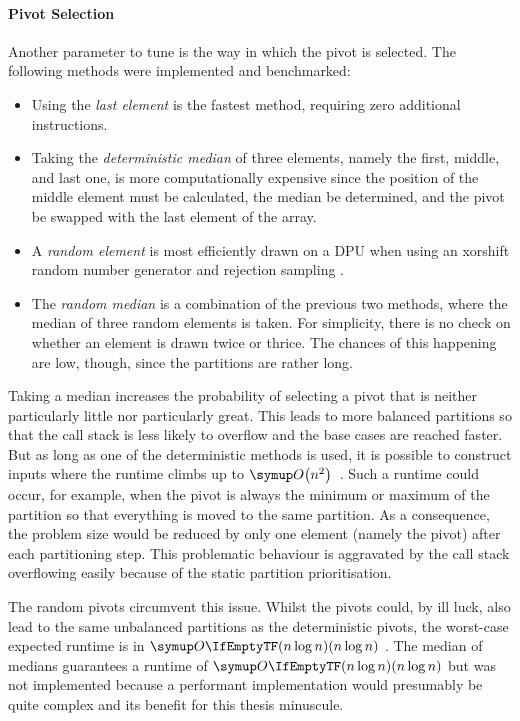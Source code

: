 \paragraph{Pivot Selection}
Another parameter to tune is the way in which the pivot is selected.
The following methods were implemented and benchmarked:
\begin{itemize}
	\item
	Using the \emph{last element} is the fastest method, requiring zero additional instructions.

	\item
	Taking the \emph{deterministic median} of three elements, namely the first, middle, and last one, is more computationally expensive since the position of the middle element must be calculated, the median be determined, and the pivot be swapped with the last element of the array.

	\item
	A \emph{random element} is most efficiently drawn on a \ac{DPU} when using an xorshift random number generator and rejection sampling \cite{lukas_geis}.

	\item
	The \emph{random median} is a combination of the previous two methods, where the median of three random elements is taken.
	For simplicity, there is no check on whether an element is drawn twice or thrice.
	The chances of this happening are low, though, since the partitions are rather long.
\end{itemize}
Taking a median increases the probability of selecting a pivot that is neither particularly little nor particularly great.
This leads to more balanced partitions so that the call stack is less likely to overflow and the base cases are reached faster.
But as long as one of the deterministic methods is used, it is possible to construct inputs where the runtime climbs up to \(\bigoh*{n^2}\)~\cite{erkiö1984worstcase}.
Such a runtime could occur, for example, when the pivot is always the minimum or maximum of the partition so that everything is moved to the same partition.
As a consequence, the problem size would be reduced by only one element (namely the pivot) after each partitioning step.
This problematic behaviour is aggravated by the call stack overflowing easily because of the static partition prioritisation.

The random pivots circumvent this issue.
Whilst the pivots could, by ill luck, also lead to the same unbalanced partitions as the deterministic pivots, the worst-case expected runtime is in \(\bigoh{n \log n}\) \cite{blum2011probabilistic}.
The median of medians \cite{blum1973median} guarantees a runtime of \(\bigoh{n \log n}\) but was not implemented because a performant implementation would presumably be quite complex and its benefit for this thesis minuscule.
